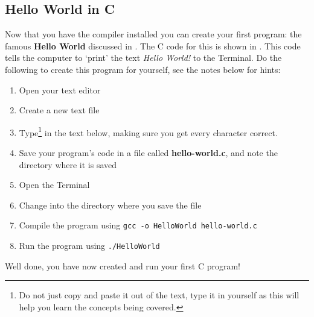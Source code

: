 \clearpage
\subsection{Hello World in C} %
\label{sub:hello_world_in_c}

Now that you have the compiler installed you can create your first program: the famous \textbf{Hello World} discussed in . The C code for this is shown in . This code tells the computer to `print' the text \emph{Hello World!} to the Terminal. Do the following to create this program for yourself, see the notes below for hints:

\begin{enumerate}
  \item Open your text editor
  \item Create a new text file
  \item Type\footnote{Do not just copy and paste it out of the text, type it in yourself as this will help you learn the concepts being covered.} in the text below, making sure you get every character correct.
  \item Save your program's code in a file called \textbf{hello-world.c}, and note the directory where it is saved
  \item Open the Terminal
  \item Change into the directory where you save the file
  \item Compile the program using \texttt{gcc -o HelloWorld hello-world.c}
  \item Run the program using \texttt{./HelloWorld}
\end{enumerate}

Well done, you have now created and run your first C program!

\csection
{
}


